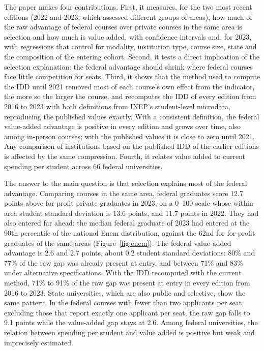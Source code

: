 \documentclass[12pt,letterpaper]{article}
\begin{document}
The paper makes four contributions. First, it measures, for the two most recent editions (2022 and 2023, which assessed different groups of areas), how much of the raw advantage of federal courses over private courses in the same area is selection and how much is value added, with confidence intervals and, for 2023, with regressions that control for modality, institution type, course size, state and the composition of the entering cohort. Second, it tests a direct implication of the selection explanation: the federal advantage should shrink where federal courses face little competition for seats. Third, it shows that the method used to compute the IDD until 2021 removed most of each course's own effect from the indicator, the more so the larger the course, and recomputes the IDD of every edition from 2016 to 2023 with both definitions from INEP's student-level microdata, reproducing the published values exactly. With a consistent definition, the federal value-added advantage is positive in every edition and grows over time, also among in-person courses; with the published values it is close to zero until 2021. Any comparison of institutions based on the published IDD of the earlier editions is affected by the same compression. Fourth, it relates value added to current spending per student across 66 federal universities.

The answer to the main question is that selection explains most of the federal advantage. Comparing courses in the same area, federal graduates score 12.7 points above for-profit private graduates in 2023, on a 0--100 scale whose within-area student standard deviation is 13.6 points, and 11.7 points in 2022. They had also entered far ahead: the median federal graduate of 2023 had entered at the 90th percentile of the national Enem distribution, against the 62nd for for-profit graduates of the same areas (Figure~\ref{fig:enem}). The federal value-added advantage is 2.6 and 2.7 points, about 0.2 student standard deviations: 80\% and 77\% of the raw gap was already present at entry, and between 71\% and 83\% under alternative specifications. With the IDD recomputed with the current method, 71\% to 91\% of the raw gap was present at entry in every edition from 2016 to 2023. State universities, which are also public and selective, show the same pattern. In the federal courses with fewer than two applicants per seat, excluding those that report exactly one applicant per seat, the raw gap falls to 9.1 points while the value-added gap stays at 2.6. Among federal universities, the relation between spending per student and value added is positive but weak and imprecisely estimated.
\end{document}
